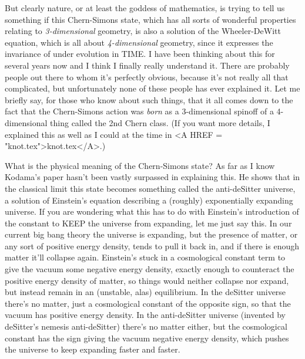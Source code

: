 But clearly nature, or at least the goddess of mathematics, is
trying to tell us something if this Chern-Simons state, which
has all sorts of wonderful properties relating to \emph{3-dimensional}
geometry, is also a solution of the Wheeler-DeWitt equation, which
is all about \emph{4-dimensional} geometry, since it expresses
the invariance of \psi  under evolution in TIME.  I have been thinking
about this for several years now and I think I finally really
understand it.  There are probably people out there to whom it's
perfectly obvious, because it's not really all that complicated, but
unfortunately none of these people has ever explained it.  Let me briefly 
say, for those who know about such things, that it all comes down to 
the fact that the Chern-Simons action was \emph{born} as a 3-dimensional 
spinoff of a 4-dimensional thing called the 2nd Chern class.  (If you 
want more details, I explained this as well as I could at the time in 
<A HREF = "knot.tex">knot.tex</A>.)  

What is the physical meaning of the Chern-Simons state?  As far as
I know Kodama's paper hasn't been vastly surpassed in explaining
this.  He shows that in the classical limit this state becomes something
called the anti-deSitter universe, a solution of Einstein's equation
describing a (roughly) exponentially expanding universe.  If you are
wondering what this has to do with Einstein's introduction of the
constant to KEEP the universe from expanding, let me just say this.
In our current big bang theory the universe is expanding, but the
presence of matter, or any sort of positive energy density, tends to pull it
back in, and if there is enough matter it'll collapse again.  Einstein's
stuck in a cosmological constant term to give the vacuum some negative
energy density, exactly enough to counteract the positive energy
density of matter, so things would neither collapse nor expand,
but instead remain in an (unstable, alas) equilibrium.  In the deSitter
universe there's no matter, just a cosmological constant of the opposite 
sign, so that the vacuum has positive energy density.  In the anti-deSitter
universe (invented by deSitter's nemesis anti-deSitter) there's no matter
either, but the cosmological constant has the sign giving the vacuum 
negative energy density, which pushes the universe to keep expanding
faster and faster.  

